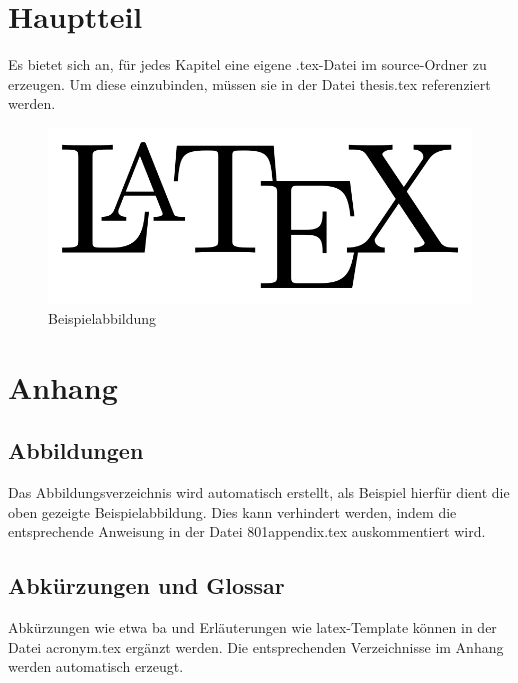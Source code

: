 \section{Hauptteil}\label{Hauptteil}

Es bietet sich an, für jedes Kapitel eine eigene .tex-Datei im source-Ordner zu erzeugen. Um diese einzubinden, müssen sie in der Datei thesis.tex referenziert werden.

\begin{figure}[H]
    \centering
    \includegraphics[width={\textwidth/2}]{images/pictures/LaTeX_logo.svg.png}
    \caption{Beispielabbildung}
    \label{figure:example}
\end{figure}

\section{Anhang}\label{Anhang}

\subsection{Abbildungen}\label{Abbildungen}

Das Abbildungsverzeichnis wird automatisch erstellt, als Beispiel hierfür dient die oben gezeigte Beispielabbildung. Dies kann verhindert werden, indem die entsprechende Anweisung in der Datei 801\textunderscore appendix.tex auskommentiert wird.

\subsection{Abkürzungen und Glossar}\label{Abkürzungen und Glossar}

Abkürzungen wie etwa \acrshort{ba} und Erläuterungen wie \Gls{latex}-Template können in der Datei acronym.tex ergänzt werden. Die entsprechenden Verzeichnisse im Anhang werden automatisch erzeugt.


